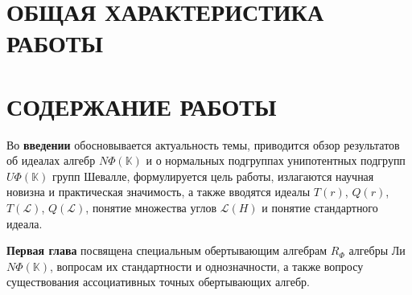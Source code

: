 \section*{ОБЩАЯ ХАРАКТЕРИСТИКА РАБОТЫ}

\newcommand{\actuality}{\pdfbookmark[1]{Актуальность}{actuality}\textbf{{\actualityTXT}}}
\newcommand{\progress}{\pdfbookmark[1]{Разработанность темы}{progress}\textbf{{\progressTXT}}}
\newcommand{\aim}{\pdfbookmark[1]{Цели}{aim}{{\textbf\aimTXT}}}
\newcommand{\tasks}{\pdfbookmark[1]{Задачи}{tasks}\textbf{{\tasksTXT}}}
\newcommand{\novelty}{\pdfbookmark[1]{Основные результаты работы}{novelty}\textbf{{\noveltyTXT}}}
\newcommand{\influence}{\pdfbookmark[1]{Практическая значимость}{influence}\textbf{{\influenceTXT}}}
\newcommand{\methods}{\pdfbookmark[1]{Методы исследования}{methods}\textbf{{\methodsTXT}}}
\newcommand{\defpositions}{\pdfbookmark[1]{Положения, выносимые на защиту}{defpositions}\textbf{{\defpositionsTXT}}}
\newcommand{\reliability}{\pdfbookmark[1]{Достоверность}{reliability}\textbf{{\reliabilityTXT}}}
\newcommand{\probation}{\pdfbookmark[1]{Апробация}{probation}\textbf{{\probationTXT}}}
\newcommand{\contribution}{\pdfbookmark[1]{Личный вклад}{contribution}\textbf{{\contributionTXT}}}
\newcommand{\publications}{\pdfbookmark[1]{Публикации}{publications}\textbf{{\publicationsTXT}}}


\section*{СОДЕРЖАНИЕ РАБОТЫ}

Во \textbf{введении} обосновывается актуальность темы, приводится обзор
результатов об идеалах алгебр $N\Phi(\mathbb{K})$ и о нормальных подгруппах
унипотентных подгрупп $U\Phi(\mathbb{K})$ групп Шевалле, формулируется цель
работы, излагаются научная новизна и практическая значимость, а также вводятся
идеалы $T(r)$, $Q(r)$, $T(\mathcal{L})$, $Q(\mathcal{L})$, понятие множества
углов $\mathcal{L}(H)$ и понятие стандартного идеала.

\medskip

\textbf{Первая глава} посвящена специальным обертывающим алгебрам
$R_{\Phi}$ алгебры Ли $N\Phi(\mathbb{K})$, вопросам их стандартности и
однозначности, а также вопросу существования ассоциативных точных
обертывающих алгебр.

